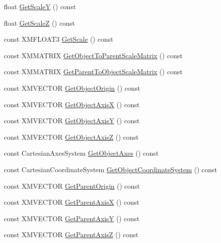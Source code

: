 \begin{DoxyCompactItemize}
float \hyperlink{classmage_1_1_transform_node_a8b4023dc2dd9a62012ee0aa36ec022b5}{Get\+ScaleY} () const
\item 
float \hyperlink{classmage_1_1_transform_node_afba2781f69e1abe50b9a2ad87f641439}{Get\+ScaleZ} () const
\item 
const X\+M\+F\+L\+O\+A\+T3 \hyperlink{classmage_1_1_transform_node_acb0846fdaf70a8a88c4fe316032b5a0c}{Get\+Scale} () const
\item 
const X\+M\+M\+A\+T\+R\+IX \hyperlink{classmage_1_1_transform_node_a36cbdebf999dc41871446f12c129041d}{Get\+Object\+To\+Parent\+Scale\+Matrix} () const
\item 
const X\+M\+M\+A\+T\+R\+IX \hyperlink{classmage_1_1_transform_node_a99da2ec9e52fdfc1e9279f1e3fc2fc15}{Get\+Parent\+To\+Object\+Scale\+Matrix} () const
\item 
const X\+M\+V\+E\+C\+T\+OR \hyperlink{classmage_1_1_transform_node_adc1edf6bde3772904073b360f17a65d2}{Get\+Object\+Origin} () const
\item 
const X\+M\+V\+E\+C\+T\+OR \hyperlink{classmage_1_1_transform_node_a6a6375218a90d18163aeec59d91a68e2}{Get\+Object\+AxisX} () const
\item 
const X\+M\+V\+E\+C\+T\+OR \hyperlink{classmage_1_1_transform_node_a807df3821f17d6b7ce1f7ca5a56b552d}{Get\+Object\+AxisY} () const
\item 
const X\+M\+V\+E\+C\+T\+OR \hyperlink{classmage_1_1_transform_node_a425c9ba06004d1de35ca97813524882a}{Get\+Object\+AxisZ} () const
\item 
const Cartesian\+Axes\+System \hyperlink{classmage_1_1_transform_node_aa6d5feb41f6e6d1582d26721ba537fdb}{Get\+Object\+Axes} () const
\item 
const Cartesian\+Coordinate\+System \hyperlink{classmage_1_1_transform_node_aa293ee88682b0d4ca6f5d7d6439595aa}{Get\+Object\+Coordinate\+System} () const
\item 
const X\+M\+V\+E\+C\+T\+OR \hyperlink{classmage_1_1_transform_node_ac22e00fc9d96642bf96bcbb121d685ab}{Get\+Parent\+Origin} () const
\item 
const X\+M\+V\+E\+C\+T\+OR \hyperlink{classmage_1_1_transform_node_a64aae2ae63bc53791d3febed5a51f989}{Get\+Parent\+AxisX} () const
\item 
const X\+M\+V\+E\+C\+T\+OR \hyperlink{classmage_1_1_transform_node_a67b78520c247ac38d853481e76e144c8}{Get\+Parent\+AxisY} () const
\item 
const X\+M\+V\+E\+C\+T\+OR \hyperlink{classmage_1_1_transform_node_ae165746ea0907f39429608b06d4c57af}{Get\+Parent\+AxisZ} () const

\end{DoxyCompactItemize}
